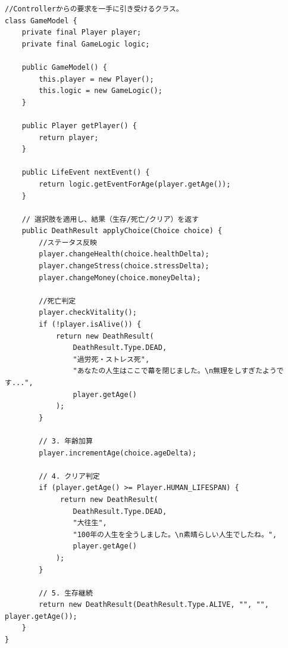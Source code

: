 \documentclass[a4paper,11pt]{jsarticle}
\begin{document}
\begin{lstlisting}[caption=GameModel.java]
//Controllerからの要求を一手に引き受けるクラス。
class GameModel {
    private final Player player;
    private final GameLogic logic;

    public GameModel() {
        this.player = new Player();
        this.logic = new GameLogic();
    }

    public Player getPlayer() {
        return player;
    }

    public LifeEvent nextEvent() {
        return logic.getEventForAge(player.getAge());
    }

    // 選択肢を適用し、結果（生存/死亡/クリア）を返す
    public DeathResult applyChoice(Choice choice) {
        //ステータス反映
        player.changeHealth(choice.healthDelta);
        player.changeStress(choice.stressDelta);
        player.changeMoney(choice.moneyDelta);
        
        //死亡判定
        player.checkVitality();
        if (!player.isAlive()) {
            return new DeathResult(
                DeathResult.Type.DEAD, 
                "過労死・ストレス死", 
                "あなたの人生はここで幕を閉じました。\n無理をしすぎたようです...", 
                player.getAge()
            );
        }

        // 3. 年齢加算
        player.incrementAge(choice.ageDelta);

        // 4. クリア判定
        if (player.getAge() >= Player.HUMAN_LIFESPAN) {
             return new DeathResult(
                DeathResult.Type.DEAD, 
                "大往生", 
                "100年の人生を全うしました。\n素晴らしい人生でしたね。", 
                player.getAge()
            );
        }

        // 5. 生存継続
        return new DeathResult(DeathResult.Type.ALIVE, "", "", player.getAge());
    }
}
\end{lstlisting}
\end{document}
